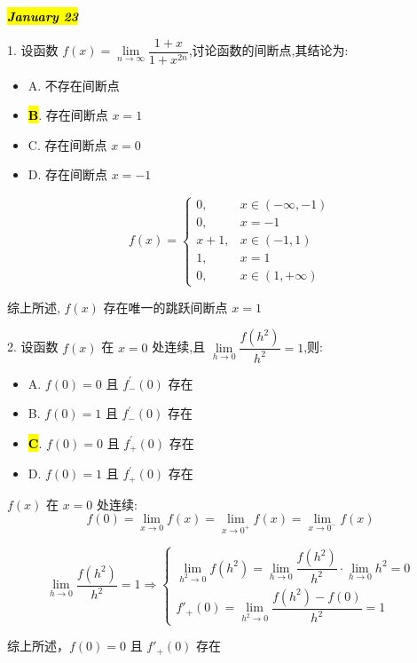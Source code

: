 \hl{\textbf{\textit{January 23}}}

1. 设函数 $f(x)=\lim\limits_{n\to \infty}\dfrac{1+x}{1+x^{2n}}$,讨论函数的间断点,其结论为:
\begin{itemize}
	\item A. 不存在间断点
	\item \hl{\textbf{B}}. 存在间断点 $x=1$
	\item C. 存在间断点 $x=0$
	\item D. 存在间断点 $x=-1$
\end{itemize}
\begin{solution}

	$$f(x) = \begin{cases}
	0, & x\in(-\infty,-1)\\
	0, & x = -1\\
	x+1, & x\in(-1,1)\\
	1, & x = 1\\
	0, & x\in(1,+\infty)
	\end{cases}$$

	综上所述, $f(x)$ 存在唯一的跳跃间断点 $x = 1$
\end{solution}

2. 设函数 $f(x)$ 在 $x=0$ 处连续,且 $\lim\limits_{h\to 0}\dfrac{f(h^{2})}{h^{2}}=1$,则:
\begin{itemize}
	\item A. $f(0)=0$ 且 $f_{-}^{'}(0)$ 存在
	\item B. $f(0)=1$ 且 $f_{-}^{'}(0)$ 存在
	\item \hl{\textbf{C}}. $f(0)=0$ 且 $f_{+}^{'}(0)$ 存在
	\item D. $f(0)=1$ 且 $f_{+}^{'}(0)$ 存在
\end{itemize}
\begin{solution}

	$f(x)$ 在 $x=0$ 处连续:
	$$f(0) = \lim\limits_{x\to 0}f(x) = \lim\limits_{x\to 0^{+}}f(x) = \lim\limits_{x\to 0^{-}}f(x)$$

	$$\lim\limits_{h\to 0}\dfrac{f(h^{2})}{h^{2}}=1\Rightarrow 
	\begin{cases}
		\lim\limits_{h^{2}\to 0}f(h^{2}) = \lim\limits_{h\to 0}\dfrac{f(h^{2})}{h^{2}}\cdot \lim\limits_{h\to 0}h^{2}=0\\
		f'_{+}(0) = \lim\limits_{h^{2}\to 0}\dfrac{f(h^{2})-f(0)}{h^{2}}=1
	\end{cases}$$

	综上所述，$f(0) = 0$ 且 $f'_{+}(0)$ 存在 
\end{solution}

